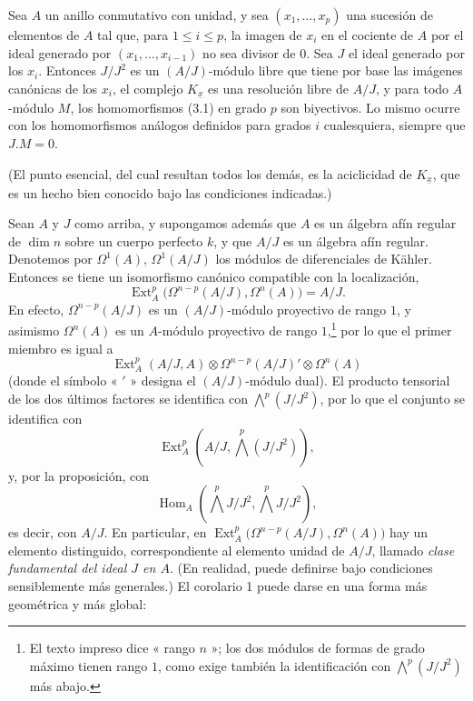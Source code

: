  Sea $A$ un anillo conmutativo con unidad, y sea
$(x_1,\ldots,x_p)$ una sucesión de elementos de $A$ tal que, para $1\leq i\leq p$,
la imagen de $x_i$ en el cociente de $A$ por el ideal generado por
$(x_1,\ldots,x_{i-1})$ no sea divisor de $0$. Sea $J$ el ideal generado
por los $x_i$. Entonces $J/J^{2}$ es un $(A/J)$-módulo libre que tiene por base las
imágenes canónicas de los $x_i$, el complejo $K_{\underline{x}}$ es una resolución
libre de $A/J$, y para todo $A$-módulo $M$, los homomorfismos (3.1) en
grado $p$ son biyectivos. Lo mismo ocurre con los homomorfismos análogos
definidos para grados $i$ cualesquiera, siempre que $J.M=0$.

(El punto esencial, del cual resultan todos los demás, es la aciclicidad de
$K_{\underline{x}}$, que es un hecho bien conocido bajo las condiciones indicadas.)

 Sean $A$ y $J$ como arriba, y supongamos además que
$A$ es un álgebra afín regular de $\dim n$ sobre un cuerpo perfecto $k$, y
que $A/J$ es un álgebra afín regular. Denotemos por $\Omega^{1}(A)$,
$\Omega^{1}(A/J)$ los módulos de diferenciales de Kähler. Entonces se tiene un
isomorfismo canónico compatible con la localización,
\begin{equation}\tag{3.5}
  \operatorname{Ext}_{A}^{p}\bigl(\Omega^{n-p}(A/J),\Omega^{n}(A)\bigr)=A/J.
\end{equation}
En efecto, $\Omega^{n-p}(A/J)$ es un $(A/J)$-módulo proyectivo de rango $1$, y asimismo
$\Omega^{n}(A)$ es un $A$-módulo proyectivo de rango $1$,\footnote{El texto impreso
dice « rango $n$ »; los dos módulos de formas de grado máximo tienen rango
$1$, como exige también la identificación con $\bigwedge^{p}(J/J^{2})$ más abajo.}
por lo que el primer miembro es igual a
\[
  \operatorname{Ext}_{A}^{p}(A/J,A)
  \otimes\Omega^{n-p}(A/J)'\otimes\Omega^{n}(A)
\]
(donde el símbolo « $'$ » designa el $(A/J)$-módulo dual). El producto tensorial de los
dos últimos factores se identifica con $\bigwedge^{p}(J/J^{2})$, por lo que el conjunto
se identifica con
\[
  \operatorname{Ext}_{A}^{p}\!\left(A/J,\bigwedge^{p}(J/J^{2})\right),
\]
y, por la proposición, con
\[
  \operatorname{Hom}_{A}\!\left(\bigwedge^{p}J/J^{2},
  \bigwedge^{p}J/J^{2}\right),
\]
es decir, con $A/J$. En particular, en
$\operatorname{Ext}_{A}^{p}\bigl(\Omega^{n-p}(A/J),\Omega^{n}(A)\bigr)$ hay un
elemento distinguido, correspondiente al elemento unidad de $A/J$, llamado
\emph{clase fundamental del ideal $J$ en $A$}. (En realidad, puede
definirse bajo condiciones sensiblemente más generales.) El
corolario 1 puede darse en una forma más geométrica y más global:

